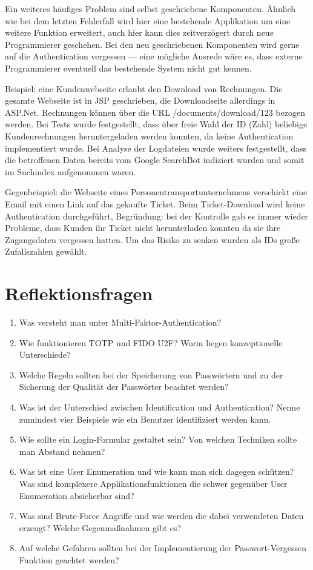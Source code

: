 Ein weiteres häufiges Problem sind selbst geschriebene Komponenten. Ähnlich wie bei dem letzten Fehlerfall wird hier eine bestehende Applikation um eine weitere Funktion erweitert, auch hier kann dies zeitverzögert durch neue Programmierer geschehen. Bei den neu geschriebenen Komponenten wird gerne auf die Authentication vergessen --- eine mögliche Ausrede wäre es, dass externe Programmierer eventuell das bestehende System nicht gut kennen.

Beispiel: eine Kundenwebseite erlaubt den Download von Rechnungen. Die gesamte Webseite ist in JSP geschrieben, die Downloadseite allerdings in ASP.Net. Rechnungen können über die URL /documents/download/123 bezogen werden. Bei Tests wurde festgestellt, dass über freie Wahl der ID (Zahl) beliebige Kundenrechnungen heruntergeladen werden konnten, da keine Authentication implementiert wurde. Bei Analyse der Logdateien wurde weiters festgestellt, dass die betroffenen Daten bereits vom Google SearchBot indiziert wurden und somit im Suchindex aufgenommen waren.

Gegenbeispiel: die Webseite eines Personentransportunternehmens verschickt eine Email mit einen Link auf das gekaufte Ticket. Beim Ticket-Download wird keine Authentication durchgeführt, Begründung: bei der Kontrolle gab es immer wieder Probleme, dass Kunden ihr Ticket nicht herunterladen konnten da sie ihre Zugangsdaten vergessen hatten. Um das Risiko zu senken wurden als IDs große Zufallszahlen gewählt.

\section{Reflektionsfragen}

\begin{enumerate}
	\item Was versteht man unter Multi-Faktor-Authentication?
	\item Wie funktionieren TOTP und FIDO U2F? Worin liegen konzeptionelle Unterschiede?
	\item Welche Regeln sollten bei der Speicherung von Passwörtern und zu der Sicherung der Qualität der Passwörter beachtet werden?
	\item Was ist der Unterschied zwischen Identification und Authentication? Nenne zumindest vier Beispiele wie ein Benutzer identifiziert werden kann.
	\item Wie sollte ein Login-Formular gestaltet sein? Von welchen Techniken sollte man Abstand nehmen?
	\item Was ist eine User Enumeration und wie kann man sich dagegen schützen? Was sind komplexere Applikationsfunktionen die schwer gegenüber User Enumeration absicherbar sind?
	\item Was sind Brute-Force Angriffe und wie werden die dabei verwendeten Daten erzeugt? Welche Gegenmaßnahmen gibt es?
	\item Auf welche Gefahren sollten bei der Implementierung der Passwort-Vergessen Funktion geachtet werden?
\end{enumerate}
